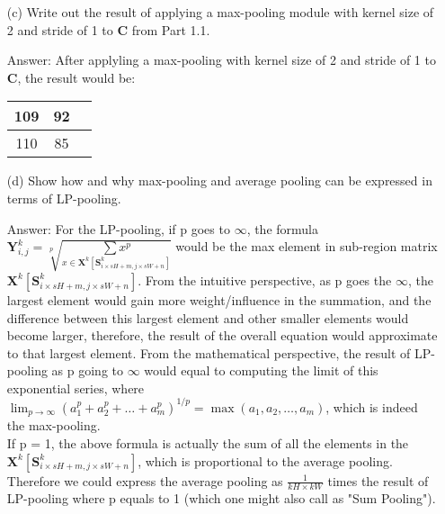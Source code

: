 \documentclass[12pt,letterpaper]{article}
\newcommand{\matr}[1]{\bm{#1}}     %
\begin{document}
\begin{itemize}
    \item[(c)] Write out the result of applying a max-pooling module with kernel size of 2 and stride of 1 to $\matr{C}$ from Part 1.1.
    
    Answer: After applyling a max-pooling with kernel size of 2 and stride of 1 to $\matr{C}$, the result would be:
    \begin{center}
        \begin{tabular}{|c|c|c|} 
    \hline
       109 & 92  \\ \hline 
       110 & 85  \\ \hline
    \end{tabular}
    \end{center}
    \item[(d)] Show how and why max-pooling and average pooling can be expressed in terms of LP-pooling.
    
    Answer: For the LP-pooling, if p goes to $\infty$, the formula $
    \matr{Y}^k_{i,j} = \sqrt[p]{\underset{x\in\matr{X}^k[\matr{S}^k_{i \times sH + m, j \times sW + n}]}{\sum x^p}}
    $ would be the max element in sub-region matrix $\matr{X}^k[\matr{S}^k_{i \times sH + m, j \times sW + n}]$. From the intuitive perspective, as p goes the $\infty$, the largest element would gain more weight/influence in the summation, and the difference between this largest element and other smaller elements would become larger, therefore, the result of the overall equation would approximate to that largest element. From the mathematical perspective, the result of LP-pooling as p going to $\infty$ would equal to computing the limit of this exponential series, where $\lim_{p \to \infty}(a_1^p + a_2^p + \ldots + a_m^p)^{1/p} = \max(a_1, a_2, \ldots, a_m)$, which is indeed the max-pooling.\\
    If p = 1, the above formula is actually the sum of all the elements in the $\matr{X}^k[\matr{S}^k_{i \times sH + m, j \times sW + n}]$, which is proportional to the average pooling. Therefore we could express the average pooling as $\frac{1}{kH\times kW}$ times the result of LP-pooling where p equals to 1 (which one might also call as "Sum Pooling").
\end{itemize}
\end{document}
